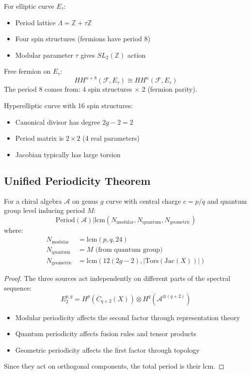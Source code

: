 \begin{example}
For elliptic curve $E_{\tau}$:
\begin{itemize}
\item Period lattice $\Lambda = \mathbb{Z} + \tau\mathbb{Z}$
\item Four spin structures (fermions have period 8)
\item Modular parameter $\tau$ gives $SL_2(\mathbb{Z})$ action
\end{itemize}

Free fermion on $E_{\tau}$:
\[
HH^{n+8}(\mathcal{F}, E_{\tau}) \cong HH^n(\mathcal{F}, E_{\tau})
\]
The period 8 comes from: 4 spin structures × 2 (fermion parity).
\end{example}

\begin{example}[Genus 2]
Hyperelliptic curve with 16 spin structures:
\begin{itemize}
\item Canonical divisor has degree $2g-2 = 2$
\item Period matrix is $2 \times 2$ (4 real parameters)
\item Jacobian typically has large torsion
\end{itemize}
\end{example}

\subsection{Unified Periodicity Theorem}

\begin{theorem}
For a chiral algebra $\mathcal{A}$ on genus $g$ curve with central charge $c = p/q$ and quantum group level inducing period $M$:
\[
\text{Period}(\mathcal{A}) | \text{lcm}(N_{\text{modular}}, N_{\text{quantum}}, N_{\text{geometric}})
\]
where:
\begin{align}
N_{\text{modular}} &= \text{lcm}(p, q, 24) \\
N_{\text{quantum}} &= M \text{ (from quantum group)} \\
N_{\text{geometric}} &= \text{lcm}(12(2g-2), |\text{Tors}(\text{Jac}(X))|)
\end{align}
\end{theorem}

\begin{proof}
The three sources act independently on different parts of the spectral sequence:
\[
E_2^{p,q} = H^p(\overline{C}_{q+2}(X)) \otimes H^q(\mathcal{A}^{\otimes(q+2)})
\]
\begin{itemize}
\item Modular periodicity affects the second factor through representation theory
\item Quantum periodicity affects fusion rules and tensor products
\item Geometric periodicity affects the first factor through topology
\end{itemize}

Since they act on orthogonal components, the total period is their lcm.
\end{proof}

